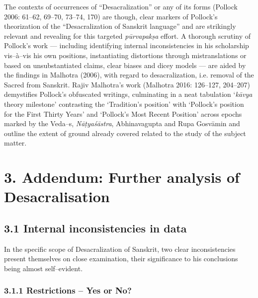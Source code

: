 The contexts of occurrences of “Desacralization” or any of its forms (Pollock 2006: 61–62, 69–70, 73–74, 170) are though, clear markers of Pollock’s theorization of the “Desacralization of Sanskrit language” and are strikingly relevant and revealing for this targeted \textit{pūrvapakṣa} effort. A thorough scrutiny of Pollock’s work — including identifying internal inconsistencies in his scholarship vis–à–vis his own positions, instantiating distortions through mistranslations or based on unsubstantiated claims, clear biases and dicey models — are aided by the findings in Malhotra (2006), with regard to desacralization, i.e. removal of the Sacred from Sanskrit. Rajiv Malhotra’s work (Malhotra 2016: 126–127, 204–207) demystifies Pollock’s obfuscated writings, culminating in a neat tabulation ‘\textit{kāvya} theory milestone’ contrasting the ‘Tradition’s position’ with ‘Pollock’s position for the First Thirty Years’ and ‘Pollock’s Most Recent Position’ across epochs marked by the Veda–s, \textit{Nāṭyaśāstra}, Abhinavagupta and Rupa Gosvāmin and outline the extent of ground already covered related to the study of the subject matter.


\section*{3. Addendum: Further analysis of Desacralisation}

\subsection*{3.1 Internal inconsistencies in data}

In the specific scope of Desacralization of Sanskrit, two clear inconsistencies present themselves on close examination, their significance to his conclusions being almost self–evident.

\subsubsection*{3.1.1 Restrictions – Yes or No?}

